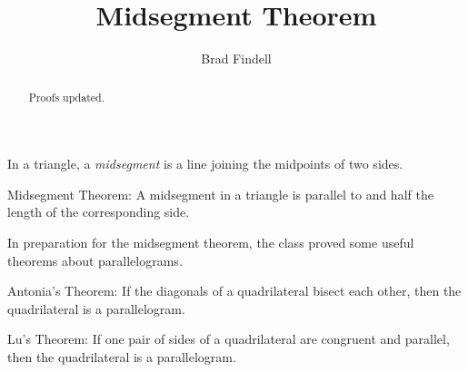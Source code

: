 \documentclass[nooutcomes]{ximera}
\title{Midsegment Theorem}
\author{Brad Findell}
\begin{document}
\begin{abstract}
Proofs updated. 
\end{abstract}
\maketitle

\begin{definition}
In a triangle, a \emph{midsegment} is a line joining the midpoints of two sides.  
\end{definition}

\begin{theorem}
Midsegment Theorem:  A midsegment in a triangle is parallel to and half the length of the corresponding side.
\end{theorem}


In preparation for the midsegment theorem, the class proved some useful theorems about parallelograms. 

\begin{theorem}
Antonia's Theorem:  If the diagonals of a quadrilateral bisect each other, then the quadrilateral is a parallelogram. 
\end{theorem}

\begin{theorem}
Lu's Theorem:  If one pair of sides of a quadrilateral are congruent and parallel, then the quadrilateral is a parallelogram. 
\end{theorem}
\end{document}
